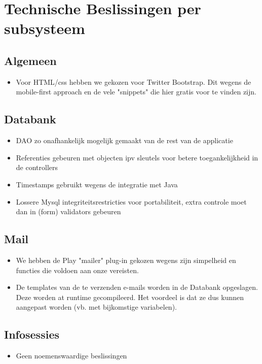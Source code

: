 \documentclass[11pt,a4paper,oneside]{article}
\begin{document}
\section{Technische Beslissingen per subsysteem}
\subsection{Algemeen}
\begin{itemize}
\item Voor HTML/css hebben we gekozen voor Twitter Bootstrap. Dit wegens de mobile-first approach en de vele "snippets" die hier gratis voor te vinden zijn.
\end{itemize}
\subsection{Databank}
\begin{itemize}
\item DAO zo onafhankelijk mogelijk gemaakt van de rest van de applicatie
\item Referenties gebeuren met objecten ipv sleutels voor betere toegankelijkheid in de controllers
\item Timestamps gebruikt wegens de integratie met Java
\item Lossere Mysql integriteitsrestricties voor portabiliteit, extra controle moet dan in (form) validators gebeuren
\end{itemize}
\subsection{Mail}
\begin{itemize}
\item We hebben de Play "mailer" plug-in gekozen wegens zijn simpelheid en functies die voldoen aan onze vereisten.
\item De templates van de te verzenden e-mails worden in de Databank opgeslagen. Deze worden at runtime gecompileerd. Het voordeel is dat ze dus kunnen aangepast worden (vb. met bijkomstige variabelen).
\end{itemize}
\subsection{Infosessies}
\begin{itemize}
\item Geen noemenswaardige beslissingen
\end{itemize}
\end{document}
